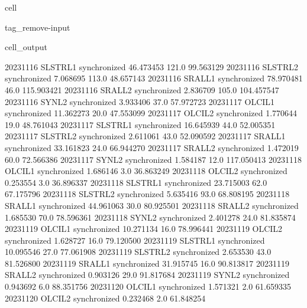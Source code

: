 \documentclass[letterpaper,10pt,english]{jupyterBook}
\begin{document}
\begin{sphinxuseclass}{cell}
\begin{sphinxuseclass}{tag_remove-input}
\begin{sphinxVerbatimOutput}
\begin{sphinxuseclass}{cell_output}
\begin{sphinxVerbatim}[commandchars=\\\{\}]
2023\PYGZhy{}11\PYGZhy{}16     SLSTR\PYGZus{}L1  synchronized   46.473453   121.0   99.563129
2023\PYGZhy{}11\PYGZhy{}16     SLSTR\PYGZus{}L2  synchronized    7.068695   113.0   48.657143
2023\PYGZhy{}11\PYGZhy{}16      SRAL\PYGZus{}L1  synchronized   78.970481    46.0  115.903421
2023\PYGZhy{}11\PYGZhy{}16      SRAL\PYGZus{}L2  synchronized    2.836709   105.0  104.457547
2023\PYGZhy{}11\PYGZhy{}16       SYN\PYGZus{}L2  synchronized    3.933406    37.0   57.972723
2023\PYGZhy{}11\PYGZhy{}17      OLCI\PYGZus{}L1  synchronized   11.362273    20.0   47.553099
2023\PYGZhy{}11\PYGZhy{}17      OLCI\PYGZus{}L2  synchronized    1.770644    19.0   48.761043
2023\PYGZhy{}11\PYGZhy{}17     SLSTR\PYGZus{}L1  synchronized   16.645939    44.0   52.005351
2023\PYGZhy{}11\PYGZhy{}17     SLSTR\PYGZus{}L2  synchronized    2.611061    43.0   52.090592
2023\PYGZhy{}11\PYGZhy{}17      SRAL\PYGZus{}L1  synchronized   33.161823    24.0   66.944270
2023\PYGZhy{}11\PYGZhy{}17      SRAL\PYGZus{}L2  synchronized    1.472019    60.0   72.566386
2023\PYGZhy{}11\PYGZhy{}17       SYN\PYGZus{}L2  synchronized    1.584187    12.0  117.050413
2023\PYGZhy{}11\PYGZhy{}18      OLCI\PYGZus{}L1  synchronized    1.686146     3.0   36.863249
2023\PYGZhy{}11\PYGZhy{}18      OLCI\PYGZus{}L2  synchronized    0.253554     3.0   36.896337
2023\PYGZhy{}11\PYGZhy{}18     SLSTR\PYGZus{}L1  synchronized   23.715003    62.0   67.175796
2023\PYGZhy{}11\PYGZhy{}18     SLSTR\PYGZus{}L2  synchronized    5.635416    93.0   68.808195
2023\PYGZhy{}11\PYGZhy{}18      SRAL\PYGZus{}L1  synchronized   44.961063    30.0   80.925501
2023\PYGZhy{}11\PYGZhy{}18      SRAL\PYGZus{}L2  synchronized    1.685530    70.0   78.596361
2023\PYGZhy{}11\PYGZhy{}18       SYN\PYGZus{}L2  synchronized    2.401278    24.0   81.835874
2023\PYGZhy{}11\PYGZhy{}19      OLCI\PYGZus{}L1  synchronized   10.271134    16.0   78.996441
2023\PYGZhy{}11\PYGZhy{}19      OLCI\PYGZus{}L2  synchronized    1.628727    16.0   79.120500
2023\PYGZhy{}11\PYGZhy{}19     SLSTR\PYGZus{}L1  synchronized   10.095546    27.0   77.061908
2023\PYGZhy{}11\PYGZhy{}19     SLSTR\PYGZus{}L2  synchronized    2.653530    43.0   81.526800
2023\PYGZhy{}11\PYGZhy{}19      SRAL\PYGZus{}L1  synchronized   31.915745    16.0   90.813817
2023\PYGZhy{}11\PYGZhy{}19      SRAL\PYGZus{}L2  synchronized    0.903126    29.0   91.817684
2023\PYGZhy{}11\PYGZhy{}19       SYN\PYGZus{}L2  synchronized    0.943692     6.0   88.351756
2023\PYGZhy{}11\PYGZhy{}20      OLCI\PYGZus{}L1  synchronized    1.571321     2.0   61.659335
2023\PYGZhy{}11\PYGZhy{}20      OLCI\PYGZus{}L2  synchronized    0.232468     2.0   61.848254

\end{sphinxVerbatim}
\end{sphinxuseclass}
\end{sphinxVerbatimOutput}
\end{sphinxuseclass}
\end{sphinxuseclass}
\end{document}
